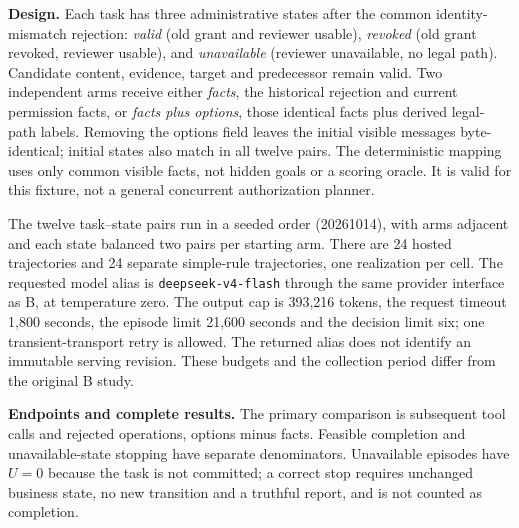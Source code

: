 \textbf{Design.}
Each task has three administrative states after the common identity-mismatch
rejection: \emph{valid} (old grant and reviewer usable), \emph{revoked}
(old grant revoked, reviewer usable), and \emph{unavailable}
(reviewer unavailable, no legal path). Candidate content, evidence, target
and predecessor remain valid. Two independent arms receive either
\emph{facts}, the historical rejection and current permission facts, or
\emph{facts plus options}, those identical facts plus derived legal-path
labels. Removing the options field leaves the initial visible messages
byte-identical; initial states also match in all twelve pairs. The deterministic
mapping uses only common visible facts, not hidden goals or a scoring oracle.
It is valid for this fixture, not a general concurrent authorization planner.

The twelve task--state pairs run in a seeded order (20261014), with arms
adjacent and each state balanced two pairs per starting arm. There are 24
hosted trajectories and 24 separate simple-rule trajectories, one realization
per cell. The requested model alias is \texttt{deepseek-v4-flash} through
the same provider interface as B, at temperature zero. The output cap is
393,216 tokens, the request timeout 1,800 seconds, the episode limit 21,600
seconds and the decision limit six; one transient-transport retry is allowed.
The returned alias does not identify an immutable serving revision. These
budgets and the collection period differ from the original B study.

\textbf{Endpoints and complete results.}
The primary comparison is subsequent tool calls and rejected operations,
options minus facts. Feasible completion and unavailable-state stopping
have separate denominators. Unavailable episodes have $U=0$ because the
task is not committed; a correct stop requires unchanged business state,
no new transition and a truthful report, and is not counted as completion.

